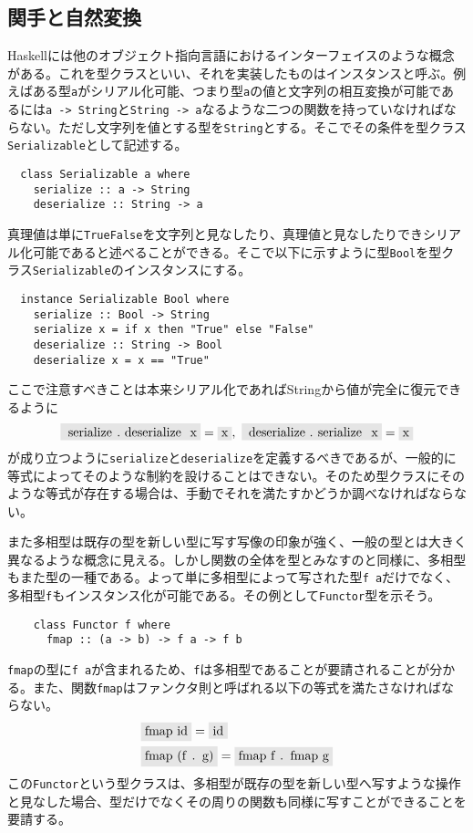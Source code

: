 \documentclass[uplatex,dvipdfmx]{jsarticle}
\newcommand{\pr}[1]{\colorbox[rgb]{0.9,0.9,0.9}{\lstinline{#1}}}
\begin{document}
  \subsection{関手と自然変換}
  Haskellには他のオブジェクト指向言語におけるインターフェイスのような概念がある。これを型クラスといい、それを実装したものはインスタンスと呼ぶ。例えばある型\pr{a}がシリアル化可能、つまり型\pr{a}の値と文字列の相互変換が可能であるには\pr{a -> String}と\pr{String -> a}なるような二つの関数を持っていなければならない。ただし文字列を値とする型を\pr{String}とする。そこでその条件を型クラス\pr{Serializable}として記述する。
  \begin{lstlisting}
  class Serializable a where
    serialize :: a -> String
    deserialize :: String -> a
  \end{lstlisting}
  真理値は単に\pr{True}\pr{False}を文字列と見なしたり、真理値と見なしたりできシリアル化可能であると述べることができる。そこで以下に示すように型\pr{Bool}を型クラス\pr{Serializable}のインスタンスにする。
  \begin{lstlisting}
  instance Serializable Bool where
    serialize :: Bool -> String
    serialize x = if x then "True" else "False"
    deserialize :: String -> Bool
    deserialize x = x == "True"
  \end{lstlisting}
  ここで注意すべきことは本来シリアル化であればStringから値が完全に復元できるように
  \[\pr{serialize.deserialize x} = \pr{x} ,\ \pr{deserialize.serialize x} = \pr{x}\]が成り立つように\pr{serialize}と\pr{deserialize}を定義するべきであるが、一般的に等式によってそのような制約を設けることはできない。そのため型クラスにそのような等式が存在する場合は、手動でそれを満たすかどうか調べなければならない。

  また多相型は既存の型を新しい型に写す写像の印象が強く、一般の型とは大きく異なるような概念に見える。しかし関数の全体を型とみなすのと同様に、多相型もまた型の一種である。よって単に多相型によって写された型\pr{f a}だけでなく、多相型\pr{f}もインスタンス化が可能である。その例として\pr{Functor}型を示そう。
  \begin{lstlisting}
    class Functor f where
      fmap :: (a -> b) -> f a -> f b
  \end{lstlisting}
  \pr{fmap}の型に\pr{f a}が含まれるため、\pr{f}は多相型であることが要請されることが分かる。また、関数\pr{fmap}はファンクタ則と呼ばれる以下の等式を満たさなければならない。
  \begin{align*}
    &\pr{fmap id} = \pr{id}\\
    &\pr{fmap (f . g)} = \pr{fmap f . fmap g}
  \end{align*}
  この\pr{Functor}という型クラスは、多相型が既存の型を新しい型へ写すような操作と見なした場合、型だけでなくその周りの関数も同様に写すことができることを要請する。
\end{document}
